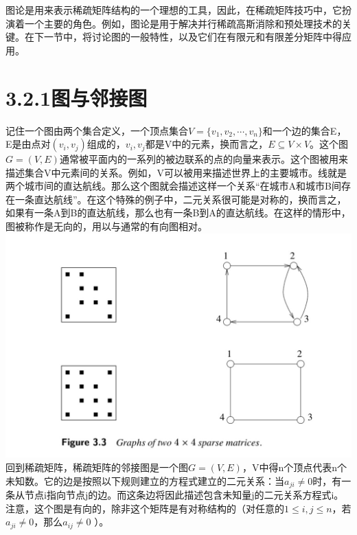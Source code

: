 \documentclass{article}
\begin{document}
图论是用来表示稀疏矩阵结构的一个理想的工具，因此，在稀疏矩阵技巧中，它扮演着一个主要的角色。例如，图论是用于解决并行稀疏高斯消除和预处理技术的关键。在下一节中，将讨论图的一般特性，以及它们在有限元和有限差分矩阵中得应用。
\newline
\section*{3.2.1图与邻接图}
记住一个图由两个集合定义，一个顶点集合$V =\{v_1,v_2,\cdots,v_n\}$和一个边的集合E，E是由点对$(v_i,v_j)$组成的，$v_i,v_j$都是V中的元素，换而言之，$E\subseteq V\times V$。这个图$G=(V,E)$通常被平面内的一系列的被边联系的点的向量来表示。这个图被用来描述集合V中元素间的关系。例如，V可以被用来描述世界上的主要城市。线就是两个城市间的直达航线。那么这个图就会描述这样一个关系“在城市A和城市B间存在一条直达航线”。在这个特殊的例子中，二元关系很可能是对称的，换而言之，如果有一条A到B的直达航线，那么也有一条B到A的直达航线。在这样的情形中，图被称作是无向的，用以与通常的有向图相对。
  \newline\newline\newline\newline\newline\newline\newline\newline\newline
\includegraphics[scale=0.25]{3_3.png}
\newline\newline
回到稀疏矩阵，稀疏矩阵的邻接图是一个图$G=(V,E)$，V中得n个顶点代表n个未知数。它的边是按照以下规则建立的方程式建立的二元关系：当$a_{ji}\neq0$时，有一条从节点i指向节点j的边。而这条边将因此描述包含未知量j的二元关系方程式i。注意，这个图是有向的，除非这个矩阵是有对称结构的（对任意的$1\leq i,j\leq n$，若$a_{ji}\neq 0$，那么$a_{ij}\neq 0$ ）。
\end{document}
